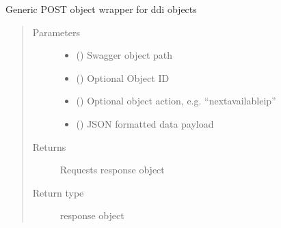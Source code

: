 \documentclass[letterpaper,10pt,english]{sphinxmanual}
\begin{document}
\begin{fulllineitems}
\begin{fulllineitems}
\begin{quote}
\begin{description}
\end{description}\end{quote}

\end{fulllineitems}


\begin{fulllineitems}
\label{\detokenize{b1ddi-class:bloxone.b1ddi.post}}
\sphinxAtStartPar
Generic POST object wrapper for ddi objects
\begin{quote}\begin{description}
\item[{Parameters}] \leavevmode\begin{itemize}
\item {} 
\sphinxAtStartPar
{} () \textendash{} Swagger object path

\item {} 
\sphinxAtStartPar
{} () \textendash{} Optional Object ID

\item {} 
\sphinxAtStartPar
{} () \textendash{} Optional object action, e.g. “nextavailableip”

\item {} 
\sphinxAtStartPar
{} () \textendash{} JSON formatted data payload

\end{itemize}

\item[{Returns}] \leavevmode
\sphinxAtStartPar
Requests response object

\item[{Return type}] \leavevmode
\sphinxAtStartPar
response object


\end{description}
\end{quote}
\end{fulllineitems}
\end{fulllineitems}
\end{document}
